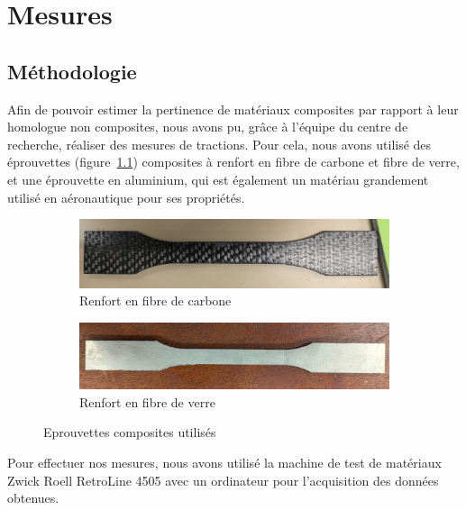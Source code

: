 \chapter{Mesures}


\section{Méthodologie}


Afin de pouvoir estimer la pertinence de matériaux composites par rapport à leur homologue non composites, nous avons pu, grâce à l'équipe du centre de recherche, réaliser des mesures de tractions.
Pour cela, nous avons utilisé des éprouvettes (figure~\ref{fig:eprouvettes}) composites à renfort en fibre de carbone et fibre de verre, et une éprouvette en aluminium, qui est également un matériau grandement utilisé en aéronautique pour ses propriétés.
\vspace{10pt}
\begin{figure}[htb!]
    \centering
    \begin{subfigure}[t]{.4\textwidth}
        \centering
        \includegraphics[width=\textwidth]{../ressources/images/eprouvette_fibre_carbone}
        \caption{Renfort en fibre de carbone}
    \end{subfigure}
    \begin{subfigure}[t]{.4\textwidth}
        \centering
        \includegraphics[width=\textwidth]{../ressources/images/eprouvette_fibre_verre}
        \caption{Renfort en fibre de verre}
    \end{subfigure}
    \caption{Eprouvettes composites utilisés}
    \label{fig:eprouvettes}
\end{figure}

Pour effectuer nos mesures, nous avons utilisé la machine de test de matériaux Zwick Roell RetroLine 4505 avec un ordinateur pour l'acquisition des données obtenues.



